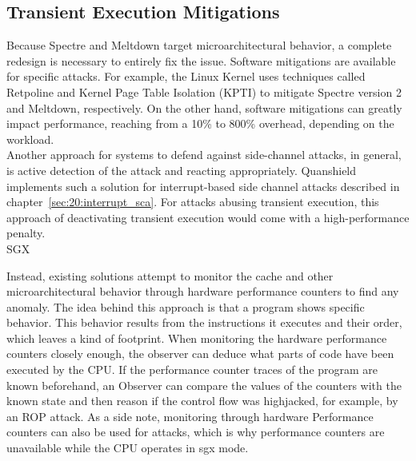 \subsection{Transient Execution Mitigations}
\label{sec:20:def_sca}
Because Spectre and Meltdown target microarchitectural behavior, a complete
redesign is necessary to entirely fix the issue. Software mitigations are
available for specific attacks. For example, the Linux Kernel uses techniques
called Retpoline and Kernel Page Table Isolation (KPTI) to mitigate Spectre
version 2 and Meltdown, respectively.\cite{retpoline} On the other hand,
software mitigations can greatly impact performance, reaching from a 10\% to
800\% overhead, depending on the workload.\cite{low2018overview}\\

Another approach for systems to defend against side-channel attacks, in general,
is active detection of the attack and reacting appropriately. Quanshield
implements such a solution for interrupt-based side channel attacks described in
chapter~\ref{sec:20:interrupt_sca}. For attacks abusing transient execution,
this approach of deactivating transient execution would come with a
high-performance penalty.\\SGX

Instead, existing solutions attempt to monitor the cache and other
microarchitectural behavior through hardware performance counters to find any
anomaly. The idea behind this approach is that a program shows specific
behavior. This behavior results from the instructions it executes and their
order, which leaves a kind of footprint. When monitoring the hardware
performance counters closely enough, the observer can deduce what parts of code
have been executed by the CPU. If the performance counter traces of the program
are known beforehand, an Observer can compare the values of the counters with
the known state and then reason if the control flow was highjacked, for example,
by an ROP attack. As a side note, monitoring through hardware Performance
counters can also be used for attacks, which is why performance counters are
unavailable while the CPU operates in \gls{sgx} mode.
\cite{uhsadel2008exploiting,costan2016intel}

